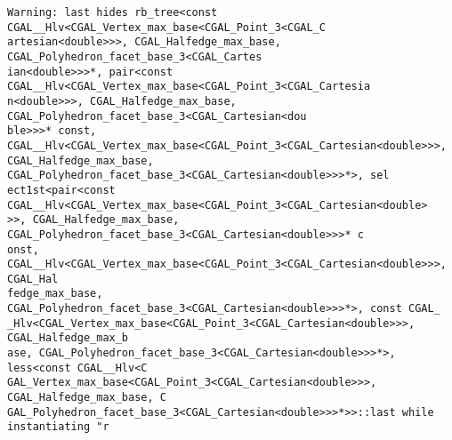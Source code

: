 
\xdef\oldBodyAttributes{\lcBodyAttributes}
\gdef\lcBodyAttributes{\lcRawHtml{background="Developers_manual/fig/background.gif"}}

\begin{titlepage}
\begin{lcTexBlock}
{\color[gray]{0.2}%
\verb+Warning: last hides rb_tree<const CGAL__Hlv<CGAL_Vertex_max_base<CGAL_Point_3<CGAL_C+\\
\verb+artesian<double>>>, CGAL_Halfedge_max_base, CGAL_Polyhedron_facet_base_3<CGAL_Cartes+\\
\verb+ian<double>>>*, pair<const CGAL__Hlv<CGAL_Vertex_max_base<CGAL_Point_3<CGAL_Cartesia+\\
\verb+n<double>>>, CGAL_Halfedge_max_base, CGAL_Polyhedron_facet_base_3<CGAL_Cartesian<dou+\\
\verb+ble>>>* const, CGAL__Hlv<CGAL_Vertex_max_base<CGAL_Point_3<CGAL_Cartesian<double>>>,+\\
\verb+CGAL_Halfedge_max_base, CGAL_Polyhedron_facet_base_3<CGAL_Cartesian<double>>>*>, sel+\\
\verb+ect1st<pair<const CGAL__Hlv<CGAL_Vertex_max_base<CGAL_Point_3<CGAL_Cartesian<double>+\\
\verb+>>, CGAL_Halfedge_max_base, CGAL_Polyhedron_facet_base_3<CGAL_Cartesian<double>>>* c+\\
\verb+onst, CGAL__Hlv<CGAL_Vertex_max_base<CGAL_Point_3<CGAL_Cartesian<double>>>, CGAL_Hal+\\
\verb+fedge_max_base, CGAL_Polyhedron_facet_base_3<CGAL_Cartesian<double>>>*>, const CGAL_+\\
\verb+_Hlv<CGAL_Vertex_max_base<CGAL_Point_3<CGAL_Cartesian<double>>>, CGAL_Halfedge_max_b+\\
\verb+ase, CGAL_Polyhedron_facet_base_3<CGAL_Cartesian<double>>>*>, less<const CGAL__Hlv<C+\\
\verb+GAL_Vertex_max_base<CGAL_Point_3<CGAL_Cartesian<double>>>, CGAL_Halfedge_max_base, C+\\
\verb+GAL_Polyhedron_facet_base_3<CGAL_Cartesian<double>>>*>>::last while instantiating "r+\\
}
\end{lcTexBlock}
\end{titlepage}
